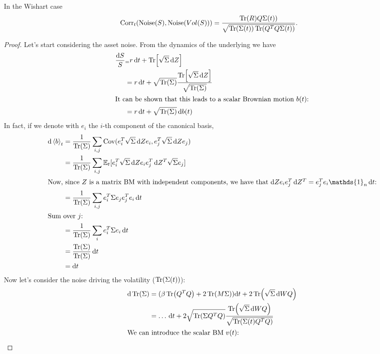 \begin{proposition}
    In the Wishart case
    \begin{align}
        \operatorname{Corr}_t(\text{Noise}(S), \text{Noise}(Vol(S))) &= \frac{\Tr(R)Q\Sigma(t))}{\sqrt{\Tr(\Sigma(t))\Tr(Q^TQ\Sigma(t))}}.
    \end{align}
\end{proposition}%
\begin{proof}
    Let's start considering the asset noise. From the dynamics of the underlying we have
    \begin{align*}
        \frac{\dd S}{S} &_= r\,\dd t + \Tr[\sqrt{\Sigma}\,\dd Z] \\
        &=
        r\,\dd t + \sqrt{\Tr(\Sigma)}\frac{\Tr[\sqrt{\Sigma}\,\dd Z]}{\sqrt{\Tr(\Sigma)}} \\
        \intertext{It can be shown that this leads to a scalar Brownian motion $b(t)$:}
        &=
        r\,\dd t + \sqrt{\Tr(\Sigma)}\,\dd b(t)
    \end{align*}
    In fact, if we denote with $e_i$ the $i$-th component of the canonical basis,
    \begin{align*}
        \dd\expval{b}_t &= \frac{1}{\Tr(\Sigma)}\sum_{i,j}\Cov(e^T_i\sqrt{\Sigma}\,\dd Z e_i, e^T_j\sqrt{\Sigma}\,\dd Z e_j) \\
        &=
        \frac{1}{\Tr(\Sigma)} \sum_{i,j}\mathbb{E}_t[e^T_i\sqrt{\Sigma}\,\dd Z e_i e^T_j\,\dd Z^T \sqrt{\Sigma} e_j] \\
        \intertext{Now, since $Z$ is a matrix BM with independent components, we have that $\dd Z e_i e^T_j\,\dd Z^T = e^T_je_i\mathds{1}_n\,\dd t$:}
        &=
        \frac{1}{\Tr(\Sigma)} \sum_{i,j} e^T_i\Sigma e_je_j^Te_i\,\dd t \\
        \intertext{Sum over $j$:}
        &=
        \frac{1}{\Tr(\Sigma)} \sum_{i} e^T_i\Sigma e_i\,\dd t \\
        &=
        \frac{\Tr(\Sigma)}{\Tr(\Sigma)}\,\dd t \\
        &=
        \dd t
    \end{align*}
    Now let's consider the noise driving the volatility ($\Tr(\Sigma(t))$):
    \begin{align*}
        \dd\Tr(\Sigma) &= (\beta\Tr(Q^TQ)+2\Tr(M\Sigma))\dd t + 2\Tr(\sqrt{\Sigma}\,\dd W Q) \\
        &=
        \dots\,\dd t + 2\sqrt{\Tr(\Sigma Q^TQ)}\frac{\Tr(\sqrt{\Sigma}\,\dd WQ)}{\sqrt{\Tr(\Sigma(t)Q^TQ)}} \\
        \intertext{We can introduce the scalar BM $v(t)$:}

\end{align*}
\end{proof}
